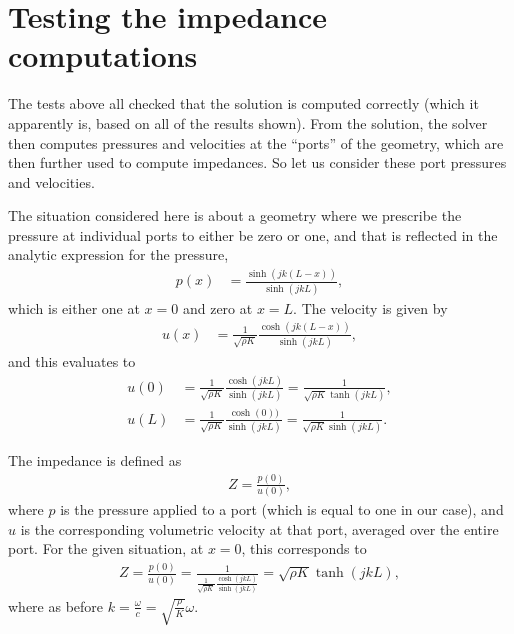 \documentclass{article}
\begin{document}
\section{Testing the impedance computations}

The tests above all checked that the solution is computed correctly
(which it apparently is, based on all of the results shown). From the
solution, the solver then computes pressures and velocities at the
``ports'' of the geometry, which are then further used to compute
impedances. So let us consider these port pressures and velocities.

The situation considered here is about a geometry where we prescribe
the pressure at individual ports to either be zero or one, and that is
reflected in the analytic expression for the pressure,
\begin{align*}
  p(x)
  &=
  \frac{\sinh(jk(L-x))}{\sinh(jkL)},
\end{align*}
which is either one at $x=0$ and zero at $x=L$. The velocity is given by
\begin{align*}
  u(x)
  &=
  \frac{1}{\sqrt{\rho K}}
  \frac{\cosh(jk(L-x))}{\sinh(jkL)},
\end{align*}
and this evaluates to
\begin{align*}
  u(0)
  &=
  \frac{1}{\sqrt{\rho K}}
  \frac{\cosh(jkL)}{\sinh(jkL)}
  =
  \frac{1}{\sqrt{\rho K}\tanh(jkL)},
\\
  u(L)
  &=
  \frac{1}{\sqrt{\rho K}}
  \frac{\cosh(0))}{\sinh(jkL)}
  =
  \frac{1}{\sqrt{\rho K}\sinh(jkL)}.
\end{align*}

The impedance is defined as 
\begin{align*}
  Z = \frac{p(0)}{u(0)},
\end{align*}
where $p$ is the pressure applied to a port (which is equal to one in
our case), and $u$ is the corresponding volumetric velocity at that
port, averaged over the entire port. For the given situation, at
$x=0$, this corresponds to
\begin{align*}
  Z = \frac{p(0)}{u(0)} 
  = 
  \frac{1}
  {\frac{1}{\sqrt{\rho K}}
  \frac{\cosh(jkL)}{\sinh(jkL)}}
  = 
  \sqrt{\rho K}\tanh(jkL),
\end{align*}
where as before $k=\frac{\omega}{c}=\sqrt{\frac{\rho}{K}}\omega$.
\end{document}
